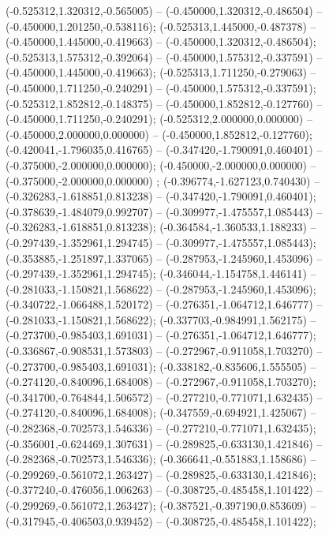  (-0.525312,1.320312,-0.565005) -- (-0.450000,1.320312,-0.486504) -- (-0.450000,1.201250,-0.538116);
 (-0.525313,1.445000,-0.487378) -- (-0.450000,1.445000,-0.419663) -- (-0.450000,1.320312,-0.486504);
 (-0.525313,1.575312,-0.392064) -- (-0.450000,1.575312,-0.337591) -- (-0.450000,1.445000,-0.419663);
 (-0.525313,1.711250,-0.279063) -- (-0.450000,1.711250,-0.240291) -- (-0.450000,1.575312,-0.337591);
 (-0.525312,1.852812,-0.148375) -- (-0.450000,1.852812,-0.127760) -- (-0.450000,1.711250,-0.240291);
 (-0.525312,2.000000,0.000000) -- (-0.450000,2.000000,0.000000) -- (-0.450000,1.852812,-0.127760);
 (-0.420041,-1.796035,0.416765) -- (-0.347420,-1.790091,0.460401) -- (-0.375000,-2.000000,0.000000);
 (-0.450000,-2.000000,0.000000) -- (-0.375000,-2.000000,0.000000) ;
 (-0.396774,-1.627123,0.740430) -- (-0.326283,-1.618851,0.813238) -- (-0.347420,-1.790091,0.460401);
 (-0.378639,-1.484079,0.992707) -- (-0.309977,-1.475557,1.085443) -- (-0.326283,-1.618851,0.813238);
 (-0.364584,-1.360533,1.188233) -- (-0.297439,-1.352961,1.294745) -- (-0.309977,-1.475557,1.085443);
 (-0.353885,-1.251897,1.337065) -- (-0.287953,-1.245960,1.453096) -- (-0.297439,-1.352961,1.294745);
 (-0.346044,-1.154758,1.446141) -- (-0.281033,-1.150821,1.568622) -- (-0.287953,-1.245960,1.453096);
 (-0.340722,-1.066488,1.520172) -- (-0.276351,-1.064712,1.646777) -- (-0.281033,-1.150821,1.568622);
 (-0.337703,-0.984991,1.562175) -- (-0.273700,-0.985403,1.691031) -- (-0.276351,-1.064712,1.646777);
 (-0.336867,-0.908531,1.573803) -- (-0.272967,-0.911058,1.703270) -- (-0.273700,-0.985403,1.691031);
 (-0.338182,-0.835606,1.555505) -- (-0.274120,-0.840096,1.684008) -- (-0.272967,-0.911058,1.703270);
 (-0.341700,-0.764844,1.506572) -- (-0.277210,-0.771071,1.632435) -- (-0.274120,-0.840096,1.684008);
 (-0.347559,-0.694921,1.425067) -- (-0.282368,-0.702573,1.546336) -- (-0.277210,-0.771071,1.632435);
 (-0.356001,-0.624469,1.307631) -- (-0.289825,-0.633130,1.421846) -- (-0.282368,-0.702573,1.546336);
 (-0.366641,-0.551883,1.158686) -- (-0.299269,-0.561072,1.263427) -- (-0.289825,-0.633130,1.421846);
 (-0.377240,-0.476056,1.006263) -- (-0.308725,-0.485458,1.101422) -- (-0.299269,-0.561072,1.263427);
 (-0.387521,-0.397190,0.853609) -- (-0.317945,-0.406503,0.939452) -- (-0.308725,-0.485458,1.101422);
